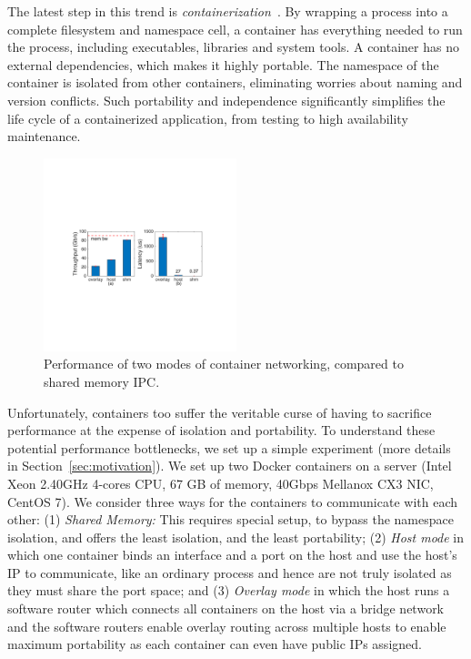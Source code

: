The latest step in this trend is {\em containerization}~\cite{XXX}.  By wrapping a process
into a complete filesystem and namespace cell, a container has everything needed
to run the process, including executables, libraries and system tools.  A
container has no external dependencies, which makes it highly portable. The
namespace of the container is isolated from other containers, eliminating
worries about naming and version conflicts.  Such portability and independence
significantly simplifies the life cycle of a containerized application, from
testing to high availability maintenance. 


\begin{figure}[th]
     \centering 
     \includegraphics[width=0.5\textwidth]{figures/intro/intro_exist2.pdf} 
     \caption{Performance of two modes of container networking, compared to
     shared memory IPC.} 
     \label{fig:three_modes} 
\end{figure} 
 Unfortunately, containers too suffer the veritable curse of having 
 to sacrifice performance at the expense of isolation and portability. 
 To understand these potential performance bottlenecks, we set up a simple experiment (more details in Section~\ref{sec:motivation}).  
 We set up two Docker containers on a
server (Intel Xeon 2.40GHz 4-cores CPU, 67 GB of memory, 40Gbps Mellanox CX3
NIC, CentOS 7). We consider three ways for the containers to communicate with
each other: (1) {\em Shared Memory:} This requires special setup,
to bypass the namespace isolation, and offers the least isolation, and the least portability;
 (2) {\em Host  mode} 
in which one container binds an interface and a port on the host and use the
host's IP to communicate, like an ordinary process and hence 
 are not truly isolated as they must share the port space; and (3)  {\em Overlay mode} in which the host runs a software
router which connects all containers on the host via  a bridge network and the software routers enable 
 overlay routing across multiple hosts to enable maximum portability as  each container can even have public IPs assigned.



